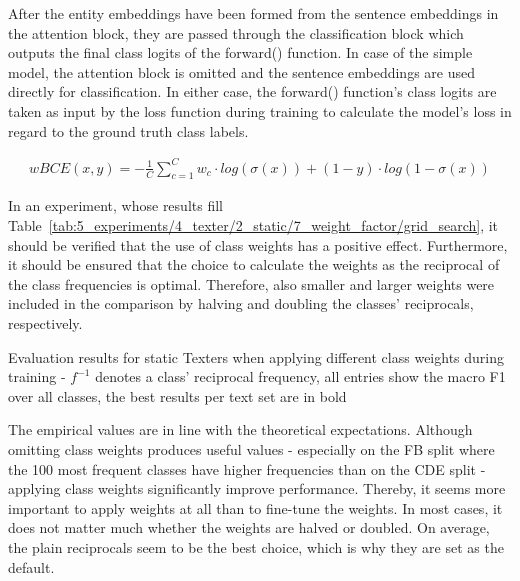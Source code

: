 After the entity embeddings have been formed from the sentence embeddings in the attention block, they are passed through the classification block which outputs the final class logits of the forward() function. In case of the simple model, the attention block is omitted and the sentence embeddings are used directly for classification. In either case, the forward() function's class logits are taken as input by the loss function during training to calculate the model's loss in regard to the ground truth class labels.


\begin{align}
    wBCE(x, y) = - \frac{1}{C} \sum_{c = 1}^C w_c \cdot log(\sigma(x)) + (1 - y) \cdot log(1 - \sigma(x))
    \label{eq:5_experiments/4_texter/2_static/7_weight_factor/wbce}
\end{align}

In an experiment, whose results fill Table~\ref{tab:5_experiments/4_texter/2_static/7_weight_factor/grid_search}, it should be verified that the use of class weights has a positive effect. Furthermore, it should be ensured that the choice to calculate the weights as the reciprocal of the class frequencies is optimal. Therefore, also smaller and larger weights were included in the comparison by halving and doubling the classes' reciprocals, respectively.

\begin{table}[t]
    \centering
    
    \caption{Evaluation results for static Texters when applying different class weights during training - $f^{-1}$ denotes a class' reciprocal frequency, all entries show the macro F1 over all classes, the best results per text set are in bold}
    \label{tab:5_experiments/4_texter/2_static/7_weight_factor/grid_search}
\end{table}

The empirical values are in line with the theoretical expectations. Although omitting class weights produces useful values - especially on the FB split where the 100 most frequent classes have higher frequencies than on the CDE split - applying class weights significantly improve performance. Thereby, it seems more important to apply weights at all than to fine-tune the weights. In most cases, it does not matter much whether the weights are halved or doubled. On average, the plain reciprocals seem to be the best choice, which is why they are set as the default.
